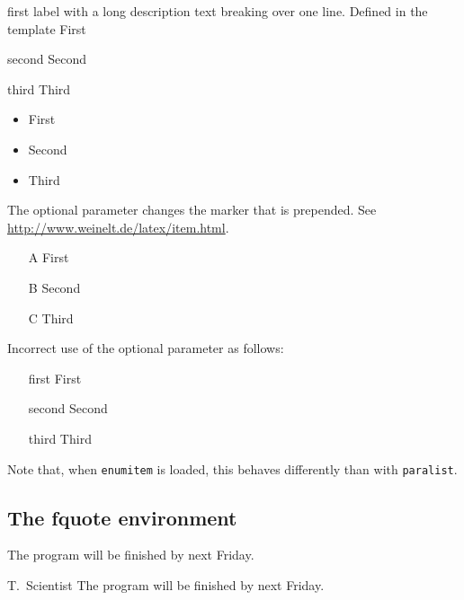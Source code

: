 \documentclass[../main-german]{subfiles}
\begin{document}
\begin{Description}
  \item[first label with a long description text breaking over one line. Defined in the template] First
  \item[second] Second
  \item[third] Third
\end{Description}

\begin{itemize}
  \item First
  \item Second
  \item Third
\end{itemize}

The optional parameter changes the marker that is prepended.
See \url{http://www.weinelt.de/latex/item.html}.
\begin{itemize}
  \item[A] First
  \item[B] Second
  \item[C] Third
\end{itemize}

Incorrect use of the optional parameter as follows:
\begin{itemize}
  \item[first] First
  \item[second] Second
  \item[third] Third
\end{itemize}
Note that, when \texttt{enumitem} is loaded, this behaves differently than with \texttt{paralist}.

\subsection{The fquote environment}

\begin{fquote}[T.\ Scientist]
  The program will be finished by next Friday.
\end{fquote}

\begin{gfquote}{T.\ Scientist}
  The program will be finished by next Friday.
\end{gfquote}
\end{document}

